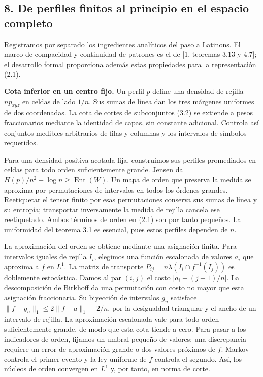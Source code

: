 \documentclass[spanish,11pt,a4paper]{article}
\begin{document}
\subsection{8. De perfiles finitos al principio en el espacio completo}\label{de-perfiles-finitos-al-principio-en-el-espacio-completo}

Registramos por separado los ingredientes analíticos del paso a Latinons. El marco de compacidad y continuidad de patrones es el de {[}1, teoremas 3.13 y 4.7{]}; el desarrollo formal proporciona además estas propiedades para la representación (2.1).

\textbf{Cota inferior en un centro fijo.} Un perfil \(p\) define una densidad de rejilla \(np_{xyz}\) en celdas de lado \(1/n\). Sus sumas de línea dan los tres márgenes uniformes de dos coordenadas. La cota de cortes de subconjuntos (3.2) se extiende a pesos fraccionarios mediante la identidad de capas, sin constante adicional. Controla así conjuntos medibles arbitrarios de filas y columnas y los intervalos de símbolos requeridos.

Para una densidad positiva acotada fija, construimos sus perfiles promediados en celdas para todo orden suficientemente grande. Jensen da \(H(p)/n^2-\log n\ge\operatorname{Ent}(W)\). Un mapa de orden que preserva la medida se aproxima por permutaciones de intervalos en todos los órdenes grandes. Reetiquetar el tensor finito por esas permutaciones conserva sus sumas de línea y su entropía; transportar inversamente la medida de rejilla cancela ese reetiquetado. Ambos términos de orden en (2.1) son por tanto pequeños. La uniformidad del teorema 3.1 es esencial, pues estos perfiles dependen de \(n\).

La aproximación del orden se obtiene mediante una asignación finita. Para intervalos iguales de rejilla \(I_i\), elegimos una función escalonada de valores \(a_i\) que aproxima a \(f\) en \(L^1\). La matriz de transporte \(P_{ij}=n\lambda(I_i\cap f^{-1}(I_j))\) es doblemente estocástica. Damos al par \((i,j)\) el costo \(|a_i-(j-1)/n|\). La descomposición de Birkhoff da una permutación con costo no mayor que esta asignación fraccionaria. Su biyección de intervalos \(g_n\) satisface \(\|f-g_n\|_1\le2\|f-a\|_1+2/n\), por la desigualdad triangular y el ancho de un intervalo de rejilla. La aproximación escalonada vale para todo orden suficientemente grande, de modo que esta cota tiende a cero. Para pasar a los indicadores de orden, fijamos un umbral pequeño de valores: una discrepancia requiere un error de aproximación grande o dos valores próximos de \(f\). Markov controla el primer evento y la ley uniforme de \(f\) controla el segundo. Así, los núcleos de orden convergen en \(L^1\) y, por tanto, en norma de corte.
\end{document}

